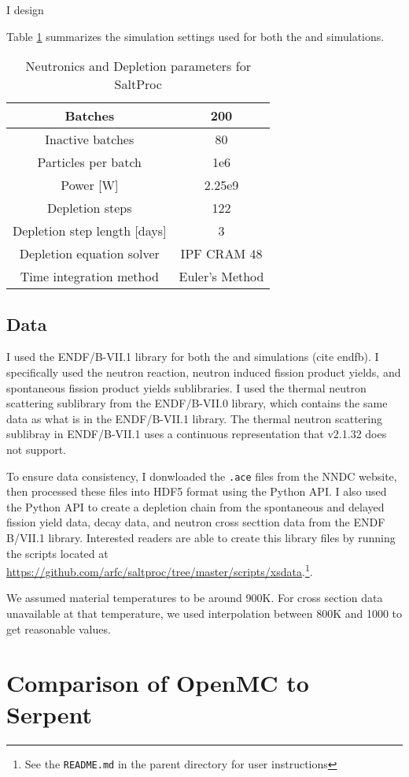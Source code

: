 I design


Table \ref{tab:saltproc-params} summarizes the simulation settings used
for both the \SerpentTWO and \OpenMC simulations.
 
\begin{table}[htpb] 
    \centering 
    \caption{Neutronics and Depletion parameters for SaltProc}
    \label{tab:saltproc-params}
    \begin{tabular}{|c|c|} 
        \hline
        Batches & 200 \\
        \hline
        Inactive batches & 80 \\
        \hline
        Particles per batch & 1e6 \\
        \hline
        Power [W] & 2.25e9 \\
        \hline
        Depletion steps & 122 \\
        \hline
        Depletion step length [days] & 3 \\
        \hline
        Depletion equation solver & IPF CRAM 48 \\
        \hline
        Time integration method & Euler's Method \\
        \hline
    \end{tabular}
\end{table}

\subsection{Data}
\label{sub:results-xs-data}

I used the ENDF/B-VII.1 library for both the \SerpentTWO and
\OpenMC simulations (cite endfb). I specifically used the neutron reaction,
neutron induced fission product yields, and spontaneous fission product yields
sublibraries. I used the thermal neutron scattering sublibrary from the
ENDF/B-VII.0 library, which contains the same data as what is in the
ENDF/B-VII.1 library. The thermal neutron scattering sublibray in ENDF/B-VII.1
uses a continuous representation that \SerpentTWO v2.1.32 does not support.

To ensure data consistency, I donwloaded the \verb,.ace, files from the NNDC
website, then processed these files into HDF5 format using the \OpenMC Python
API. I also used the Python API to create a depletion chain from the
spontaneous and delayed fission yield data, decay data, and neutron cross
secttion data from the ENDF B/VII.1 library. Interested readers are able to
create this library files by running the scripts located at
\url{https://github.com/arfc/saltproc/tree/master/scripts/xsdata}.\footnote{See
the \verb,README.md, in the parent directory for user instructions}.

We assumed material temperatures to be around 900K. For cross section data
unavailable at that temperature, we used interpolation between 800K and 1000
to get reasonable values.
 

\section{Comparison of OpenMC to Serpent}
\label{sec:openmc-vs-serpent}

